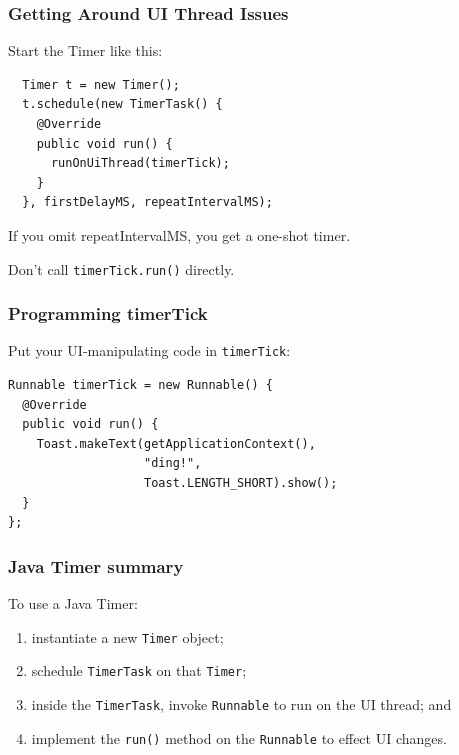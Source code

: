 \begin{frame}[fragile]
\frametitle{Getting Around UI Thread Issues}

\begin{changemargin}{1cm}
Start the Timer like this:

\begin{lstlisting}
  Timer t = new Timer();
  t.schedule(new TimerTask() {
    @Override
    public void run() {
      runOnUiThread(timerTick);
    }
  }, firstDelayMS, repeatIntervalMS);
\end{lstlisting}
If you omit repeatIntervalMS, you get a one-shot timer.

Don't call {\tt timerTick.run()} directly.
\end{changemargin}

\end{frame}

\begin{frame}[fragile]
\frametitle{Programming timerTick}

\begin{changemargin}{1cm}
Put your UI-manipulating code in {\tt timerTick}:
\begin{lstlisting}
Runnable timerTick = new Runnable() {
  @Override
  public void run() {
    Toast.makeText(getApplicationContext(), 
                   "ding!", 
                   Toast.LENGTH_SHORT).show();
  }
};
\end{lstlisting}
\end{changemargin}

\end{frame}

\begin{frame}

\frametitle{Java Timer summary}

\begin{changemargin}{1cm}
\large
To use a Java Timer:
\begin{enumerate}
\item instantiate a new {\tt Timer} object;
\item schedule {\tt TimerTask} on that {\tt Timer};
\item inside the {\tt TimerTask}, invoke {\tt Runnable} to run on the
UI thread; and
\item implement the {\tt run()} method on the {\tt Runnable} to effect
  UI changes.  
\end{enumerate}
\end{changemargin}

\end{frame}

